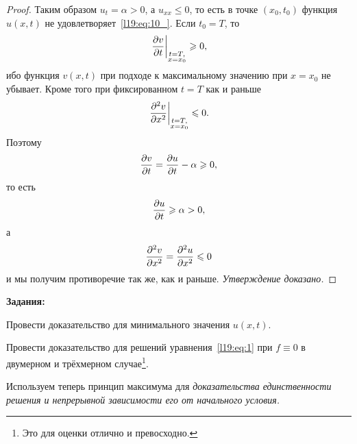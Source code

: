 \begin{proof}
	Таким образом $u_t=\alpha>0$, а $u_{xx}\leqslant0$, то есть в точке $(x_0,t_0)$ функция $u(x,t)$ не удовлетворяет~\eqref{l19:eq:10_}. Если $t_0=T$, то
	\begin{equation*}
		\hfill\displaystyle\left.\pder{v}{t}\right|_{\substack{t=T,\\ x=x_0}}\geqslant0,\hfill
	\end{equation*}
	ибо функция $v(x,t)$ при подходе к максимальному значению при $x=x_0$ не убывает. Кроме того при фиксированном $t=T$ как и раньше
	\begin{equation*}
		\hfill\displaystyle\left.\pdder{v}{x}\right|_{\substack{t=T,\\ x=x_0}}\leqslant0.\hfill
	\end{equation*}
	Поэтому 
	\begin{equation*}
		\hfill\pder{v}{t}=\pder{u}{t}-\alpha\geqslant0,\hfill
	\end{equation*} 
	то есть 
	\begin{equation*}
		\frac{\partial u}{\partial t}\geqslant\alpha>0,
	\end{equation*}
	а 
	\begin{equation*}
		\frac{\partial^2v}{\partial x^2}=\frac{\partial^2u}{\partial x^2}\leqslant0
	\end{equation*}
	и мы получим противоречие так же, как и раньше. \emph{Утверждение доказано.}
\end{proof} 

\vspace{0.2cm}
\noindent\textbf{Задания:}
\begin{enumerateD}
	\item Провести доказательство для минимального значения $u(x,t)$.
	\item Провести доказательство для решений уравнения~\eqref{l19:eq:1} при $f\equiv0$ в двумерном и трёхмерном случае\footnote{Это для оценки отлично и превосходно.}.
\end{enumerateD}

Используем теперь принцип максимума для \emph{доказательства единственности решения и непрерывной зависимости его от начального условия.}

